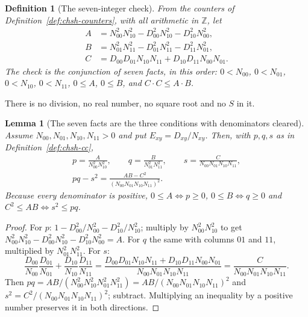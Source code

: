 \documentclass[11pt,twoside]{article}
\theoremstyle{thielethm}
\newtheorem{lemma}[theorem]{Lemma}
\theoremstyle{thieledef}
\newtheorem{definition}{Definition}[section]
\theoremstyle{thieledef}
\theoremstyle{thieledef}
\theoremstyle{thielethm}
\theoremstyle{thieleobs}
\theoremstyle{thielethm}
\begin{document}
\begin{definition}[The seven-integer check]\label{def:chsh-check}
From the counters of Definition~\ref{def:chsh-counters}, with all
arithmetic in $\mathbb{Z}$, let
\[
\begin{aligned}
A &= N_{00}^2 N_{10}^2 - D_{00}^2 N_{10}^2 - D_{10}^2 N_{00}^2, \\
B &= N_{01}^2 N_{11}^2 - D_{01}^2 N_{11}^2 - D_{11}^2 N_{01}^2, \\
C &= D_{00} D_{01} N_{10} N_{11} + D_{10} D_{11} N_{00} N_{01}.
\end{aligned}
\]
The check is the conjunction of seven facts, in this order:
$0 < N_{00}$, $0 < N_{01}$, $0 < N_{10}$, $0 < N_{11}$, $0 \le A$, $0 \le B$, and
$C \cdot C \le A \cdot B$.
\end{definition}

There is no division, no real number, no square root and no $S$ in it.

\begin{lemma}[The seven facts are the three conditions with denominators cleared]
Assume $N_{00}, N_{01}, N_{10}, N_{11} > 0$ and put $E_{xy} = D_{xy}/N_{xy}$. Then, with
$p, q, s$ as in Definition~\ref{def:chsh-cc},
\[
\begin{gathered}
p = \frac{A}{N_{00}^2 N_{10}^2}, \qquad q = \frac{B}{N_{01}^2 N_{11}^2}, \qquad
s = \frac{C}{N_{00} N_{01} N_{10} N_{11}}, \\
pq - s^2 = \frac{AB - C^2}{(N_{00} N_{01} N_{10} N_{11})^2}.
\end{gathered}
\]
Because every denominator is positive, $0 \le A \iff p \ge 0$, $0 \le B \iff q \ge 0$ and
$C^2 \le AB \iff s^2 \le pq$.
\end{lemma}

\begin{proof}
For $p$: $1 - D_{00}^2/N_{00}^2 - D_{10}^2/N_{10}^2$; multiply by $N_{00}^2 N_{10}^2$ to get
$N_{00}^2 N_{10}^2 - D_{00}^2 N_{10}^2 - D_{10}^2 N_{00}^2 = A$. For $q$ the same with
columns $01$ and $11$, multiplied by $N_{01}^2 N_{11}^2$. For $s$:
\[
\frac{D_{00}}{N_{00}} \frac{D_{01}}{N_{01}} + \frac{D_{10}}{N_{10}} \frac{D_{11}}{N_{11}}
= \frac{D_{00} D_{01} N_{10} N_{11} + D_{10} D_{11} N_{00} N_{01}}{N_{00} N_{01} N_{10} N_{11}}
= \frac{C}{N_{00} N_{01} N_{10} N_{11}}.
\]
Then
$pq = AB / (N_{00}^2 N_{10}^2 N_{01}^2 N_{11}^2) = AB/(N_{00} N_{01} N_{10} N_{11})^2$ and
$s^2 = C^2/(N_{00} N_{01} N_{10} N_{11})^2$; subtract. Multiplying an inequality by a
positive number preserves it in both directions.
\end{proof}
\end{document}
